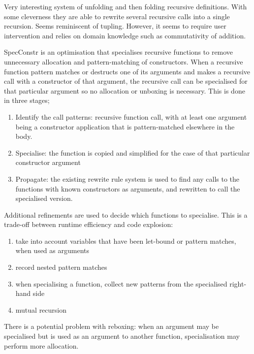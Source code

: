 Very interesting system of unfolding and then folding recursive definitions.
With some cleverness they are able to rewrite several recursive calls into a single recursion.
Seems reminiscent of tupling.
However, it seems to require user intervention and relies on domain knowledge such as commutativity of addition.


SpecConstr is an optimisation that specialises recursive functions to remove unnecessary allocation and pattern-matching of constructors.
When a recursive function pattern matches or destructs one of its arguments and makes a recursive call with a constructor of that argument,
the recursive call can be specialised for that particular argument so no allocation or unboxing is necessary.
This is done in three stages;
\begin{enumerate}
\item
Identify the call patterns: recursive function call, with at least one argument being a constructor application that is pattern-matched elsewhere in the body.
\item
Specialise: the function is copied and simplified for the case of that particular constructor argument
\item
Propagate: the existing rewrite rule system is used to find any calls to the functions with known constructors as arguments, and rewritten to call the specialised version.
\end{enumerate}
Additional refinements are used to decide which functions to specialise. This is a trade-off between runtime efficiency and code explosion:
\begin{enumerate}
\item
 take into account variables that have been let-bound or pattern matches, when used as arguments
\item
 record nested pattern matches
\item
 when specialising a function, collect new patterns from the specialised right-hand side
\item
 mutual recursion
\end{enumerate}
There is a potential problem with reboxing: when an argument may be specialised but is used as an argument to another function, specialisation may perform more allocation.




